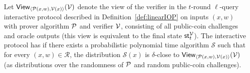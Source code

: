 \begin{definition}
Let $\textsf{View}_{\langle \mathcal{P}(x, w), \mathcal{V}(x) \rangle}(\mathcal{V})$ denote the view of the verifier in the $t$-round $\ell$-query interactive protocol described in Definition~\ref{def:linearIOP} on inputs $(x,w)$ with prover algorithm $\mathcal{P}$ and verifier $\mathcal{V}$, consisting of all public-coin challenges and oracle outputs (this view is equivalent to the final state $\textsf{st}^\mathcal{V}_t$). The interactive protocol has  if there exists a probabilistic polynomial time algorithm $\mathcal{S}$ such that for every $(x, w) \in \mathcal{R}$, the distribution $\mathcal{S}(x)$ is $\delta$-close to $\textsf{View}_{\langle \mathcal{P}(x, w), \mathcal{V}(x) \rangle}(\mathcal{V})$ (as distributions over the randomness of $\mathcal{P}$ and random public-coin challenges).
\end{definition}

\begin{comment}
We should like to define \emph{Polynomial IOP}s as a restriction of algebraic linear IOPs whereby in every round the $\ell$ $\mu_i$-variate polynomials $\vec{p}_1, \ldots, \vec{p}_\ell$ are identical and compute a vector of $m_i$ monomials in $\mathbf{X} = (X_1, \ldots, X_{\mu_i})$ in some canonical order. This restriction allows us to identify the verifier's queries $\boldsymbol{\sigma}_{i,k}$ with points in $\mathbb{F}^{\mu_i}$ and the linear oracle responses $\boldsymbol{\pi}_i^\mathsf{T} \vec{p}_{k}(\boldsymbol{\sigma}_{i,k})$ with the value of a $\mu_i$-variate polynomial $\pi(\mathbf{X}) \in \mathbb{F}[\mathbf{X}]$ when evaluated in $\boldsymbol{\sigma}_{i,k}$. However, this natural restriction induces an annoying but important subtlety: it can make sense in some Polynomial IOPs for the verifier to make \emph{non-random} queries. For example, a verifier looking to check that a polynomial evaluates to zero in a given root will fail to ascertain this fact (with high probability) if he queries in a random point. The solution to this obstacle is to determine the seed matrix $\boldsymbol{\Sigma}_i$ not uniformly at random but as the output of some computation by the verifier. This non-uniform determination changes the relation between the verifier and the public query algorithm $\mathcal{Q}$. Previously, $\mathcal{Q}$ was the part of the verifier that produced the query; now $\mathcal{V}$ produces the query and $\mathcal{Q}$ is just a simple circuit that computes monomials and that both prover and verifier can evaluate. Moreover, as the following definition of Polynomial IOPs describes the query-response interactions in the language of polynomial evaluation rather than that of inner products between coefficient vector and monomial vector, there is no need to reference $\mathcal{Q}$ at all.
\end{comment} 

